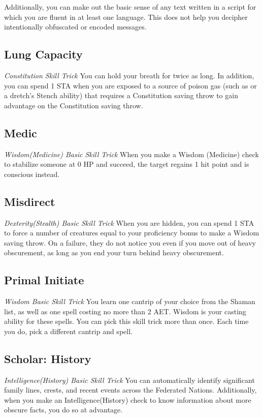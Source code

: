 Additionally, you can make out the basic sense of any text written in a script for which you are fluent in at least one language. This does not help you decipher intentionally obfuscated or encoded messages.

\subsection{Lung Capacity}\label{st:lung-capacity}
\textit{Constitution Skill Trick}
You can hold your breath for twice as long. In addition, you can spend 1 STA when you are exposed to a source of poison gas (such as  or a dretch's Stench ability) that requires a Constitution saving throw to gain advantage on the Constitution saving throw. 

\subsection{Medic}\label{st:medic}
\textit{Wisdom(Medicine) Basic Skill Trick}
When you make a Wisdom (Medicine) check to stabilize someone at 0 HP and succeed, the target regains 1 hit point and is conscious instead.

\subsection{Misdirect}\label{st:misdirect}
\textit{Dexterity(Stealth) Basic Skill Trick}
When you are hidden, you can spend 1 STA to force a number of creatures equal to your proficiency bonus to make a Wisdom saving throw. On a failure, they do not notice you even if you move out of heavy obscurement, as long as you end your turn behind heavy obscurement.

\subsection{Primal Initiate}
\textit{Wisdom Basic Skill Trick}
You learn one cantrip of your choice from the Shaman list, as well as one spell costing no more than 2 AET. Wisdom is your casting ability for these spells. You can pick this skill trick more than once. Each time you do, pick a different cantrip and spell.

\subsection{Scholar: History}\label{st:scholar-history}
\textit{Intelligence(History) Basic Skill Trick}
You can automatically identify significant family lines, crests, and recent events across the Federated Nations. Additionally, when you make an Intelligence(History) check to know information about more obscure facts, you do so at advantage.

